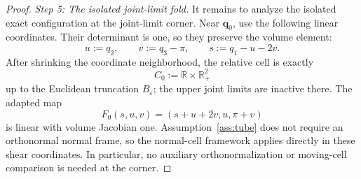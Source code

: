 \documentclass[11pt]{amsart}
\numberwithin{equation}{section}
\theoremstyle{definition}
\theoremstyle{remark}
\newcommand{\R}{\mathbb{R}}
\newcommand{\eps}{\varepsilon}
\begin{document}
\begin{proof}
\smallskip
\noindent\emph{Step 5: The isolated joint-limit fold.}
It remains to analyze the isolated exact configuration at the joint-limit
corner.  Near $\bm q_0$, use the following linear coordinates.  Their determinant
is one, so they preserve the volume element:
\begin{equation}\label{eq:robot-corner-coordinates}
 u:=q_2,
 \qquad
 v:=q_3-\pi,
 \qquad
 s:=q_1-u-2v.
\end{equation}
After shrinking the coordinate neighborhood, the relative cell is exactly
\[
 C_0:=\R\times\R_+^2
\]
up to the Euclidean truncation $B_\eps$; the upper joint limits are inactive
there.  The adapted map
\[
 F_0(s,u,v)=(s+u+2v,u,\pi+v)
\]
is linear with volume Jacobian one.  Assumption~\ref{ass:tube} does not require
an orthonormal normal frame, so the normal-cell framework applies directly in
these shear coordinates.  In particular, no auxiliary orthonormalization or
moving-cell comparison is needed at the corner.


\end{proof}
\end{document}
